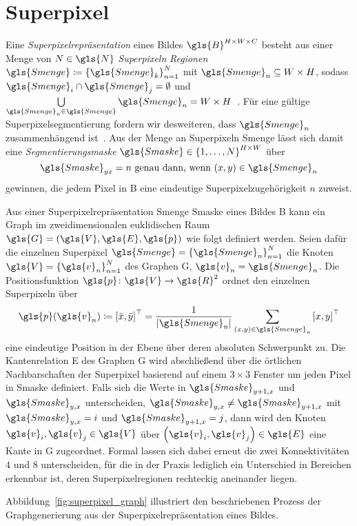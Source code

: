 \section{Superpixel}
\label{superpixel}


Eine \emph{Superpixelrepräsentation} eines Bildes $\gls{B}^{H \times W \times C}$ besteht aus einer Menge von $N \in \gls{N}$ \emph{Superpixeln} \bzw{} \emph{Regionen} $\gls{Smenge} \coloneqq {\left\{\gls{Smenge}_k\right\}}_{n=1}^N$ mit $\gls{Smenge}_n \subseteq W \times H$, sodass $\gls{Smenge}_i \cap \gls{Smenge}_j = \emptyset$ und $\bigcup\limits_{\gls{Smenge}_n \in \gls{Smenge}} \gls{Smenge}_n = W \times H$~\cite{super}.
Für eine gültige Superpixelsegmentierung fordern wir desweiteren, dass $\gls{Smenge}_n$ zusammenhängend ist~\cite{super}.
Aus der Menge an Superpixeln \gls{Smenge} lässt sich damit eine \emph{Segmentierungsmaske} $\gls{Smaske} \in {\left\{1, \ldots, N\right\}}^{H \times W}$ über
\begin{equation*}
  \gls{Smaske}_{yx} = n\,\, \text{\gdw{} } \left(x,y\right) \in \gls{Smenge}_n
\end{equation*}
gewinnen, die jedem Pixel in \gls{B} eine eindeutige Superpixelzugehörigkeit $n$ zuweist.

Aus einer Superpixelrepräsentation \gls{Smenge} \bzw{} \gls{Smaske} eines Bildes \gls{B} kann ein Graph im zweidimensionalen euklidischen Raum $\gls{G}=\left(\gls{V}, \gls{E}, \gls{p}\right)$ wie folgt definiert werden.
Seien dafür die einzelnen Superpixel $\gls{Smenge} = {\left\{\gls{Smenge}_n\right\}}_{n=1}^N$ die Knoten $\gls{V} = {\left\{\gls{v}_n\right\}}_{n=1}^N$ des Graphen \gls{G}, \dhe{} $\gls{v}_n = \gls{Smenge}_n$.
Die Positionsfunktion $\gls{p} \colon \gls{V} \to \gls{R}^2$ ordnet den einzelnen Superpixeln über
\begin{equation*}
  \gls{p}\left(\gls{v}_n\right) \coloneqq {\left[\bar{x}, \bar{y}\right]}^{\top} =  \frac{1}{\left|\gls{Smenge}_n\right|}\sum_{\left(x,y\right) \in \gls{Smenge}_n} {\left[x, y\right]}^{\top}
\end{equation*}
eine eindeutige Position in der Ebene über deren absoluten Schwerpunkt zu.
Die Kantenrelation \gls{E} des Graphen \gls{G} wird abschließend über die örtlichen Nachbarschaften der Superpixel basierend auf einem $3 \times 3$ Fenster um jeden Pixel in \gls{Smaske} definiert.
Falls sich \bspw{} die Werte in $\gls{Smaske}_{y+1,x}$ und $\gls{Smaske}_{y,x}$ unterscheiden,
\dhe{} $\gls{Smaske}_{y,x} \neq \gls{Smaske}_{y+1,x}$ mit $\gls{Smaske}_{y,x} = i$ und $\gls{Smaske}_{y+1,x}=j$, dann wird den Knoten $\gls{v}_i, \gls{v}_j \in \gls{V}$ über $\left(\gls{v}_i, \gls{v}_j\right) \in \gls{E}$ eine Kante in \gls{G} zugeordnet.
Formal lassen sich dabei erneut die zwei Konnektivitäten $4$ und $8$ unterscheiden, für die in der Praxis lediglich ein Unterschied in Bereichen erkennbar ist, deren Superpixelregionen rechteckig aneinander liegen.

Abbildung~\ref{fig:superpixel_graph} illustriert den beschriebenen Prozess der Graphgenerierung aus der Superpixelrepräsentation eines Bildes.

